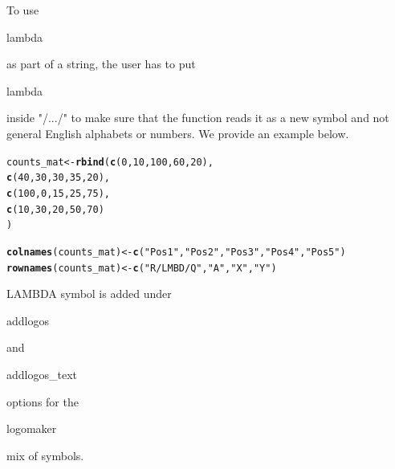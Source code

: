 \documentclass[12pt]{article}\usepackage[]{graphicx}\usepackage[usenames,dvipsnames]{color}
\makeatletter
\newcommand{\hlnum}[1]{\textcolor[rgb]{0.686,0.059,0.569}{#1}}%
\newcommand{\hlstr}[1]{\textcolor[rgb]{0.192,0.494,0.8}{#1}}%
\newcommand{\hlstd}[1]{\textcolor[rgb]{0.345,0.345,0.345}{#1}}%
\newcommand{\hlkwb}[1]{\textcolor[rgb]{0.69,0.353,0.396}{#1}}%
\newcommand{\hlkwd}[1]{\textcolor[rgb]{0.737,0.353,0.396}{\textbf{#1}}}%
\newenvironment{kframe}{%
 \def\at@end@of@kframe{}%
 \ifinner\ifhmode%
  \def\at@end@of@kframe{\end{minipage}}%
  \begin{minipage}{\columnwidth}%
 \fi\fi%
 \def\FrameCommand##1{\hskip\@totalleftmargin \hskip-\fboxsep
 \colorbox{shadecolor}{##1}\hskip-\fboxsep
     \hskip-\linewidth \hskip-\@totalleftmargin \hskip\columnwidth}%
 \MakeFramed {\advance\hsize-\width
   \@totalleftmargin\z@ \linewidth\hsize
   \@setminipage}}%
 {\par\unskip\endMakeFramed%
 \at@end@of@kframe}
\newenvironment{knitrout}{}{} %
\makeatother
\begin{document}
To use \begin{verb} lambda \end{verb} as part of a string, the user has to put \begin{verb} lambda \end{verb} inside "/.../" to make sure that the function reads it as a new symbol and not general English alphabets or numbers. We provide an example below.


\begin{knitrout}
\color{fgcolor}\begin{kframe}
\begin{alltt}
\hlstd{counts_mat} \hlkwb{<-} \hlkwd{rbind}\hlstd{(}\hlkwd{c}\hlstd{(}\hlnum{0}\hlstd{,} \hlnum{10}\hlstd{,} \hlnum{100}\hlstd{,} \hlnum{60}\hlstd{,} \hlnum{20}\hlstd{),}
                    \hlkwd{c}\hlstd{(}\hlnum{40}\hlstd{,} \hlnum{30}\hlstd{,} \hlnum{30}\hlstd{,} \hlnum{35}\hlstd{,} \hlnum{20}\hlstd{),}
                    \hlkwd{c}\hlstd{(}\hlnum{100}\hlstd{,} \hlnum{0}\hlstd{,} \hlnum{15}\hlstd{,} \hlnum{25}\hlstd{,} \hlnum{75}\hlstd{),}
                    \hlkwd{c}\hlstd{(}\hlnum{10}\hlstd{,} \hlnum{30}\hlstd{,} \hlnum{20}\hlstd{,} \hlnum{50}\hlstd{,} \hlnum{70}\hlstd{)}
\hlstd{)}

\hlkwd{colnames}\hlstd{(counts_mat)} \hlkwb{<-} \hlkwd{c}\hlstd{(}\hlstr{"Pos 1"}\hlstd{,} \hlstr{"Pos 2"}\hlstd{,} \hlstr{"Pos 3"}\hlstd{,} \hlstr{"Pos 4"}\hlstd{,} \hlstr{"Pos 5"}\hlstd{)}
\hlkwd{rownames}\hlstd{(counts_mat)} \hlkwb{<-} \hlkwd{c}\hlstd{(}\hlstr{"R/LMBD/Q"}\hlstd{,} \hlstr{"A"}\hlstd{,} \hlstr{"X"}\hlstd{,} \hlstr{"Y"}\hlstd{)}
\end{alltt}
\end{kframe}
\end{knitrout}

LAMBDA symbol is added under \begin{verb} addlogos \end{verb} and  \begin{verb} addlogos_text \end{verb} options for the \begin{verb} logomaker \end{verb} mix of symbols.
\end{document}
